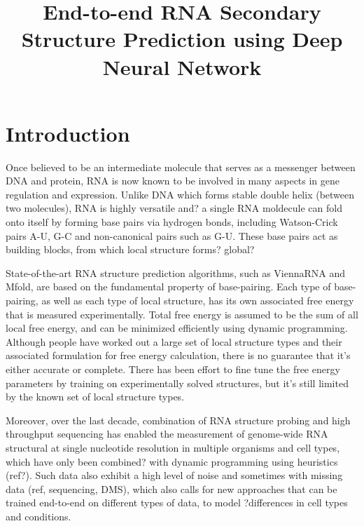 \documentclass{article}
\title{End-to-end RNA Secondary Structure Prediction using Deep Neural Network}
\begin{document}
\maketitle



\section{Introduction}

Once believed to be an intermediate molecule that serves as a messenger between DNA and protein,
RNA is now known to be involved in many aspects in gene regulation and expression.
Unlike DNA which forms stable double helix (between two molecules), RNA is highly versatile
and? a single RNA moldecule can fold onto itself by
forming base pairs via hydrogen bonds, including Watson-Crick pairs A-U,
G-C and non-canonical pairs such as G-U.
These base pairs act as building blocks, from which local structure forms? global?

State-of-the-art RNA structure prediction algorithms,
such as ViennaRNA\cite{lorenz2011viennarna} and Mfold\cite{zuker2003mfold},
are based on the fundamental property of base-pairing.
Each type of base-pairing, as well as each type of local structure,
has its own associated free energy that is measured experimentally.
Total free energy is assumed to be the sum of all local free energy,
and can be minimized efficiently using dynamic programming.
Although people have worked out a large set of local structure types and
their associated formulation for free energy calculation,
there is no guarantee that it's either accurate or complete.
There has been effort to fine tune the free energy parameters by
training on experimentally solved structures\cite{andronescu2007efficient},
but it's still limited by the known set of local structure types.

Moreover, over the last decade,
combination of RNA structure probing and high throughput sequencing has enabled
the measurement of genome-wide RNA structural at single nucleotide resolution in multiple organisms and cell types,
which have only been combined? with dynamic programming using heuristics (ref?).
Such data also exhibit a high level of noise and sometimes with missing data (ref, sequencing, DMS),
which also calls for new approaches that can be trained end-to-end on different types of data,
to model ?differences in cell types and conditions.
\end{document}
